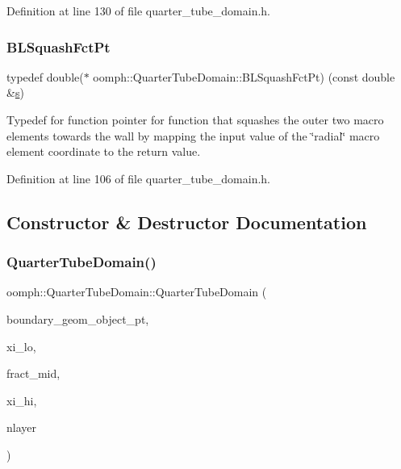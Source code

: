 Definition at line 130 of file quarter\+\_\+tube\+\_\+domain.\+h.

\mbox{\label{classoomph_1_1QuarterTubeDomain_a3d8c15c17d9912d8c519c028437c0b2c}} 
\subsubsection{\texorpdfstring{B\+L\+Squash\+Fct\+Pt}{BLSquashFctPt}}
{\footnotesize\ttfamily typedef double($\ast$ oomph\+::\+Quarter\+Tube\+Domain\+::\+B\+L\+Squash\+Fct\+Pt) (const double \&\hyperlink{cfortran_8h_ab7123126e4885ef647dd9c6e3807a21c}{s})}



Typedef for function pointer for function that squashes the outer two macro elements towards the wall by mapping the input value of the \char`\"{}radial\char`\"{} macro element coordinate to the return value. 



Definition at line 106 of file quarter\+\_\+tube\+\_\+domain.\+h.



\subsection{Constructor \& Destructor Documentation}
\mbox{\label{classoomph_1_1QuarterTubeDomain_a51cea676b1cdf56cc3f1ff5fbec952f8}} 
\subsubsection{\texorpdfstring{Quarter\+Tube\+Domain()}{QuarterTubeDomain()}\hspace{0.1cm}{\footnotesize\ttfamily [1/2]}}
{\footnotesize\ttfamily oomph\+::\+Quarter\+Tube\+Domain\+::\+Quarter\+Tube\+Domain (\begin{DoxyParamCaption}\item[{\hyperlink{classoomph_1_1GeomObject}{Geom\+Object} $\ast$}]{boundary\+\_\+geom\+\_\+object\+\_\+pt,  }\item[{const \hyperlink{classoomph_1_1Vector}{Vector}$<$ double $>$ \&}]{xi\+\_\+lo,  }\item[{const double \&}]{fract\+\_\+mid,  }\item[{const \hyperlink{classoomph_1_1Vector}{Vector}$<$ double $>$ \&}]{xi\+\_\+hi,  }\item[{const unsigned \&}]{nlayer }\end{DoxyParamCaption})\hspace{0.3cm}{\ttfamily [inline]}}



